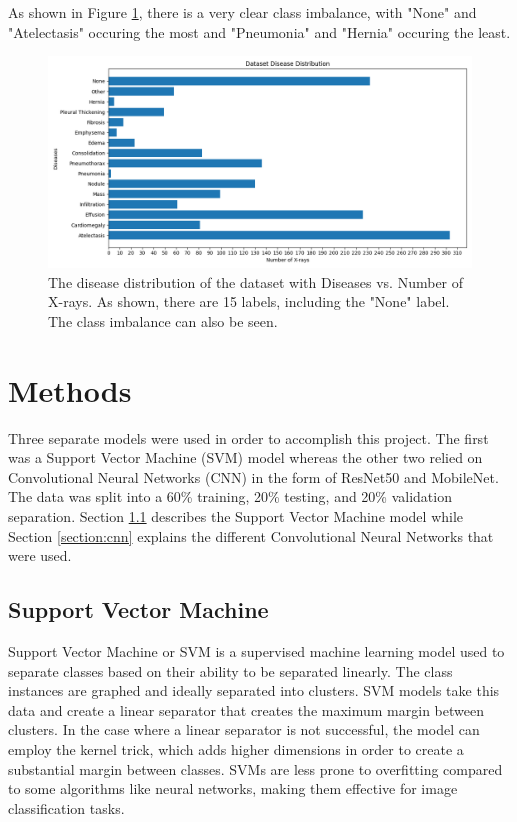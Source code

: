 \documentclass{article}
\theoremstyle{plain}
\theoremstyle{definition}
\theoremstyle{remark}
\begin{document}
As shown in Figure \ref{fig:datasetdistribution}, there is a very clear class imbalance, with "None"
and "Atelectasis" occuring the most and "Pneumonia" and "Hernia" occuring the least. 

\begin{figure}[!h]
    \centering
    \includegraphics[scale=0.55]{disease_distr}
    \caption{The disease distribution of the dataset with Diseases vs. Number of X-rays.
    As shown, there are 15 labels, including the "None" label. The class imbalance can also be seen.}
    \label{fig:datasetdistribution}
\end{figure}


\section{Methods}
Three separate models were used in order to accomplish this project. The first was a Support Vector
Machine (SVM) model whereas the other two relied on Convolutional Neural Networks (CNN) in the form
of ResNet50 and MobileNet. The data was split into a 60\% training, 20\% testing, and 20\% validation
separation. Section \ref{section:svm} describes the Support Vector Machine model while Section
\ref{section:cnn} explains the different Convolutional Neural Networks that were used.

\subsection{Support Vector Machine}
\label{section:svm}
Support Vector Machine or SVM is a supervised machine learning model used to separate classes based
on their ability to be separated linearly. The class instances are graphed and ideally separated
into clusters. SVM models take this data and create a linear separator that creates the maximum
margin between clusters. In the case where a linear separator is not successful, the model can employ
the kernel trick, which adds higher dimensions in order to create a substantial margin between classes.
SVMs are less prone to overfitting compared to some algorithms like neural networks, making them
effective for image classification tasks.
\end{document}
